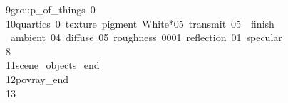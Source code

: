 \begin{tabbing}
9\>\>\>group\_of\_things\ 0\ \\[0pt]
10\>\>\>quartics\ 0\ texture\ pigment\ White*05\ transmit\ 05\ \ finish\\[0pt]
\>\ ambient\ 04\ diffuse\ 05\ roughness\ 0001\ reflection\ 01\ specular\ \\[0pt]
\>8\ \ \\[0pt]
11\>\>scene\_objects\_end\ \\[0pt]
12\>\>povray\_end\\[0pt]
13\>\end{tabbing}
